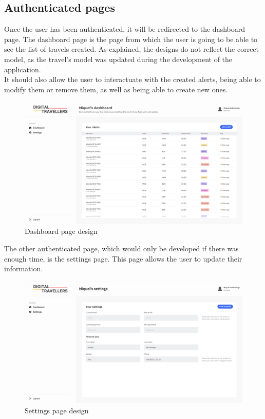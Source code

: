 \documentclass[./memory.tex]{subfiles}
\begin{document}
\subsection{Authenticated pages}
Once the user has been authenticated, it will be redirected to the dashboard
page. The dashboard page is the page from which the user is going to be able to
see the list of travels created. As explained, the designs do not reflect the
correct model, as the travel's model was updated during the development of the
application.
\\
It should also allow the user to interactuate with the created alerts, being
able to modify them or remove them, as well as being able to create new ones.
\begin{figure}[H]
	\centering
	\includegraphics[width=\textwidth]{./assets/designs/dashboard-desktop.png}
	\caption{Dashboard page design}
\end{figure}
\newpage
The other authenticated page, which would only be developed if there was enough
time, is the settings page. This page allows the user to update their
information.
\begin{figure}[H]
	\centering
	\includegraphics[width=\textwidth]{./assets/designs/settings-desktop.png}
	\caption{Settings page design}
\end{figure}
\newpage
\end{document}
